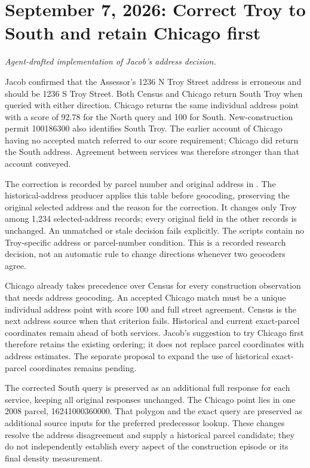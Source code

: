 \section*{September 7, 2026: Correct Troy to South and retain Chicago first}
\textit{Agent-drafted implementation of Jacob's address decision.}

Jacob confirmed that the Assessor's 1236 N Troy Street address is erroneous and
should be 1236 S Troy Street. Both Census and Chicago return South Troy when
queried with either direction. Chicago returns the same individual address point
with a score of 92.78 for the North query and 100 for South. New-construction
permit 100186300 also identifies South Troy. The earlier account of Chicago
having no accepted match referred to our score requirement; Chicago did return
the South address. Agreement between services was therefore stronger than that
account conveyed.

The correction is recorded by parcel number and original address in
. The historical-address producer applies
this table before geocoding, preserving the original selected address and the
reason for the correction. It changes only Troy among 1,234 selected-address
records; every original field in the other records is unchanged. An unmatched
or stale decision fails explicitly. The scripts contain no Troy-specific address
or parcel-number condition. This is a recorded research decision, not an automatic
rule to change directions whenever two geocoders agree.

Chicago already takes precedence over Census for every construction observation
that needs address geocoding. An accepted Chicago match must be a unique individual
address point with score 100 and full street agreement. Census is the next address
source when that criterion fails. Historical and current exact-parcel coordinates
remain ahead of both services. Jacob's suggestion to try Chicago first therefore
retains the existing ordering; it does not replace parcel coordinates with address
estimates. The separate proposal to expand the use of historical exact-parcel
coordinates remains pending.

The corrected South query is preserved as an additional full response for each
service, keeping all original responses unchanged. The Chicago point lies in one
2008 parcel, 16241000360000. That polygon and the exact query are preserved as
additional source inputs for the preferred predecessor lookup. These changes
resolve the address disagreement and supply a historical parcel candidate; they
do not independently establish every aspect of the construction episode or its
final density measurement.

